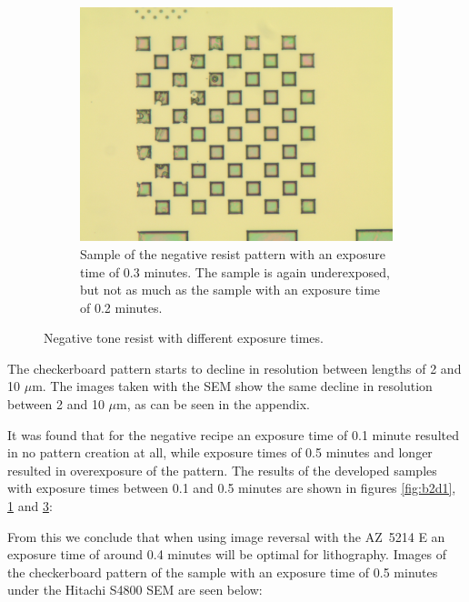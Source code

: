 \begin{figure}[!b]
\begin{subfigure}[t]{0.3\linewidth}
	    \label{fig:b2h1}
    \end{subfigure}
    \hfill
    \begin{subfigure}[t]{0.3\linewidth}
        \centering
        \includegraphics[width=\textwidth]{data/b2i1.jpg}
	    \caption{Sample of the negative resist pattern with an exposure time of 0.3 minutes. The sample is again underexposed, but not as much as the sample with an exposure time of 0.2 minutes.}
	    \label{fig:b2i1}
    \end{subfigure}
    \caption{Negative tone resist with different exposure times.}
\end{figure}

The checkerboard pattern starts to decline in resolution between lengths of 2 and 10 $\mu$m. The images taken with the SEM show the same decline in resolution between 2 and 10 $\mu$m, as can be seen in the appendix.


It was found that for the negative recipe an exposure time of 0.1 minute resulted in no pattern creation at all, while exposure times of 0.5 minutes and longer resulted in overexposure of the pattern. The results of the developed samples with exposure times between 0.1 and 0.5 minutes are shown in figures \ref{fig:b2d1}, \ref{fig:b2h1} and \ref{fig:b2i1}:


From this we conclude that when using image reversal with the AZ~5214 E an exposure time of around 0.4 minutes will be optimal for lithography. Images of the checkerboard pattern of the sample with an exposure time of 0.5 minutes under the Hitachi S4800 SEM are seen below:


